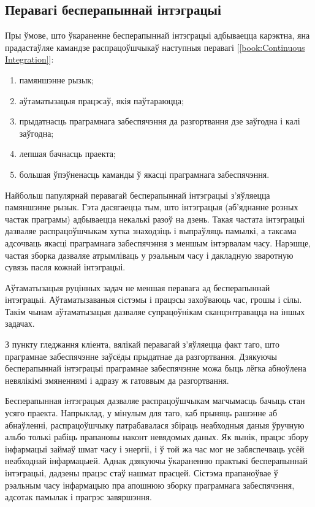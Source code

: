 \subsection{Перавагі бесперапыннай інтэграцыі}

Пры ўмове, што ўкараненне бесперапыннай інтэграцыі адбываецца карэктна,
яна прадастаўляе камандзе распрацоўшчыкаў наступныя перавагі%
[\ref{book:Continuous Integration}]:

\begin{enumerate}
    \item памяншэнне рызык;
    \item аўтаматызацыя працэсаў, якія паўтараюцца;
    \item прыдатнасць праграмнага забеспячэння да разгортвання
          дзе заўгодна і калі заўгодна;
    \item лепшая бачнасць праекта;
    \item большая ўпэўненасць каманды ў якасці праграмнага забеспячэння.
\end{enumerate}

Найбольш папулярнай перавагай бесперапыннай інтэграцыі з'яўляецца
памяншэнне рызык. Гэта дасягаецца тым, што інтэграцыя (аб'яднанне
розных частак праграмы) адбываецца некалькі разоў на дзень.
Такая частата інтэграцыі дазваляе распрацоўшчыкам хутка знаходзіць
і выпраўляць памылкі, а таксама адсочваць якасці праграмнага забеспячэння
з меншым інтэрвалам часу. Нарэшце, частая зборка дазваляе атрымліваць
у рэальным часу і дакладную зва\-рот\-ную сувязь пасля кожнай інтэграцыі.

Аўтаматызацыя руцінных задач не меншая перавага ад бесперапыннай
інтэграцыі. Аўтаматызаваныя сістэмы і працэсы захоўваюць час, грошы
і сілы. Такім чынам аўтаматызацыя дазваляе супрацоўнікам сканцэнтравацца
на іншых задачах.

З пункту гледжання кліента, вялікай перавагай з'яўляецца факт таго,
што праграмнае забеспячэнне заўсёды прыдатнае да разгортвання.
Дзякуючы бесперапыннай інтэграцыі праграмнае забеспячэнне можа
быць лёгка абноўлена невялікімі змяненнямі і адразу ж гатоввым да
разгортвання.

Бесперапынная інтэграцыя дазваляе распрацоўшчыкам магчымасць бачыць
стан усяго праекта. Напрыклад, у мінулым для таго, каб прыняць
рашэнне аб абнаўленні, распрацоўшчыку патрабавалася збіраць неабходныя
даныя ўручную альбо толькі рабіць прапановы наконт невядомых даных.
Як вынік, працэс збору інфармацыі займаў шмат часу і энергіі,
і ў той жа час мог не забяспечваць усёй неабходнай інфармацыей.
Аднак дзякуючы ўкараненню практыкі бесперапыннай інтэграцыі,
дадзены працэс стаў нашмат прасцей.
Сістэма прапаноўвае ў рэальным часу інфармацыю пра апошнюю зборку
праграмнага забеспячэння, адсотак памылак і прагрэс завяршэння.

